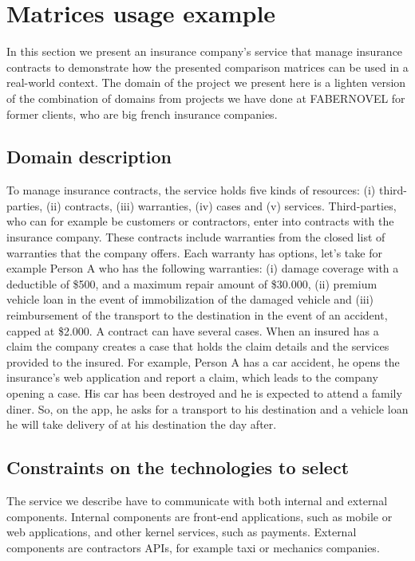 \section{Matrices usage example}

In this section we present an insurance company's service that manage insurance contracts to demonstrate how the presented comparison matrices can be used in a real-world context. The domain of the project we present here is a lighten version of the combination of domains from projects we have done at FABERNOVEL for former clients, who are big french insurance companies.

\subsection{Domain description}

To manage insurance contracts, the service holds five kinds of resources: (i) third-parties, (ii) contracts, (iii) warranties, (iv) cases and (v) services. Third-parties, who can for example be customers or contractors, enter into contracts with the insurance company. These contracts include warranties from the closed list of warranties that the company offers. Each warranty has options, let's take for example Person A who has the following warranties: (i) damage coverage with a deductible of \$500, and a maximum repair amount of \$30.000, (ii) premium vehicle loan in the event of immobilization of the damaged vehicle and (iii) reimbursement of the transport to the destination in the event of an accident, capped at \$2.000. A contract can have several cases. When an insured has a claim the company creates a case that holds the claim details and the services provided to the insured. For example, Person A has a car accident, he opens the insurance's web application and report a claim, which leads to the company opening a case. His car has been destroyed and he is expected to attend a family diner. So, on the app, he asks for a transport to his destination and a vehicle loan he will take delivery of at his destination the day after.

\subsection{Constraints on the technologies to select}

The service we describe have to communicate with both internal and external components. Internal components are front-end applications, such as mobile or web applications, and other kernel services, such as payments. External components are contractors APIs, for example taxi or mechanics companies.

